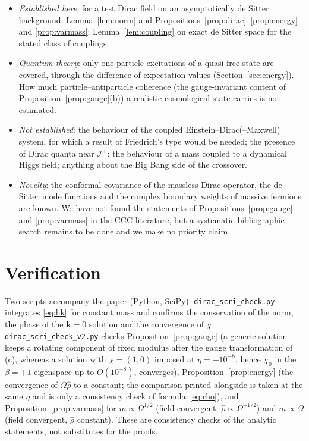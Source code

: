 \documentclass[11pt,a4paper]{article}
\theoremstyle{definition}
\newcommand{\scri}{\mathscr{I}^{+}}
\begin{document}
\begin{itemize}[leftmargin=1.5em]
\item \emph{Established here}, for a test Dirac field on an asymptotically de Sitter background: Lemma~\ref{lem:norm} and Propositions~\ref{prop:dirac}--\ref{prop:energy} and \ref{prop:varmass}; Lemma~\ref{lem:coupling} on exact de Sitter space for the stated class of couplings.
\item \emph{Quantum theory}: only one-particle excitations of a quasi-free state are covered, through the difference of expectation values (Section~\ref{sec:energy}). How much particle--antiparticle coherence (the gauge-invariant content of Proposition~\ref{prop:gauge}(b)) a realistic cosmological state carries is not estimated.
\item \emph{Not established}: the behaviour of the coupled Einstein--Dirac(--Maxwell) system, for which a result of Friedrich's type would be needed; the presence of Dirac quanta near $\scri$; the behaviour of a mass coupled to a dynamical Higgs field; anything about the Big Bang side of the crossover.
\item \emph{Novelty}: the conformal covariance of the massless Dirac operator, the de Sitter mode functions and the complex boundary weights of massive fermions are known. We have not found the statements of Propositions~\ref{prop:gauge} and \ref{prop:varmass} in the CCC literature, but a systematic bibliographic search remains to be done and we make no priority claim.
\end{itemize}

\section*{Verification}
Two scripts accompany the paper (Python, SciPy). \texttt{dirac\_scri\_check.py} integrates \eqref{eq:hk} for constant mass and confirms the conservation of the norm, the phase of the $\mathbf{k}=0$ solution and the convergence of $\chi$. \texttt{dirac\_scri\_check\_v2.py} checks Proposition~\ref{prop:gauge} (a generic solution keeps a rotating component of fixed modulus after the gauge transformation of (c), whereas a solution with $\chi=(1,0)$ imposed at $\eta=-10^{-8}$, hence $\chi_{0}$ in the $\beta=+1$ eigenspace up to $O(10^{-8})$, converges), Proposition~\ref{prop:energy} (the convergence of $\Omega\hat\rho$ to a constant; the comparison printed alongside is taken at the same $\eta$ and is only a consistency check of formula~\eqref{eq:rho}), and Proposition~\ref{prop:varmass} for $m\propto\Omega^{1/2}$ (field convergent, $\hat\rho\propto\Omega^{-1/2}$) and $m\propto\Omega$ (field convergent, $\hat\rho$ constant). These are consistency checks of the analytic statements, not substitutes for the proofs.
\end{document}
